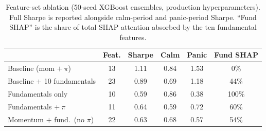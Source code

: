 \begin{table}[H]
\centering
\small
\begin{tabular}{l c c c c c}
\toprule
 & Feat. & Sharpe & Calm & Panic & Fund SHAP \\
\midrule
Baseline (mom $+\ \pi$)             & 13 & 1.11 & 0.84 & 1.53 & 0\% \\
Baseline $+$ 10 fundamentals       & 23 & 0.89 & 0.69 & 1.18 & 44\% \\
Fundamentals only                   & 10 & 0.59 & 0.86 & 0.38 & 100\% \\
Fundamentals $+\ \pi$               & 11 & 0.64 & 0.59 & 0.72 & 60\% \\
Momentum $+$ fund.\ (no $\pi$)      & 22 & 0.63 & 0.68 & 0.57 & 54\% \\
\bottomrule
\end{tabular}
\caption{Feature-set ablation (50-seed XGBoost ensembles, production hyperparameters). Full Sharpe is reported alongside calm-period and panic-period Sharpe. ``Fund SHAP'' is the share of total SHAP attention absorbed by the ten fundamental features.}
\label{tab:fund_ablation}
\end{table}
